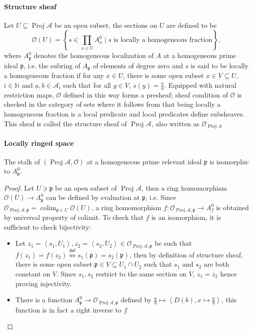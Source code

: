 \documentclass[a4paper,UKenglish,cleveref, autoref, thm-restate]{lipics-v2021}
\begin{document}
\paragraph*{Structure sheaf}
Let $U\subseteq \operatorname{Proj}\mathcal{A}$ be an open subset, the sections on $U$ are defined to be
$$
    \mathcal{O}(U) = \left\{s \in \prod_{x\in U}A_x^0\mid s\text{~is locally a homogeneous fraction}\right\},   
$$
where $A^0_{\mathfrak{p}}$ denotes the homogeneous localization of $A$ at a homogeneous prime ideal $\mathfrak{p}$, i.e. the subring of $A_{\mathfrak{p}}$ of elements of degree zero and $s$ is said to be locally a homogeneous fraction if for any $x \in U$, there is some open subset $x\in V \subseteq U$, $i\in\mathbb{N}$ and $a, b\in\mathcal{A}_i$ such that for all $y\in V$, $s(y)=\frac{a}{b}$. Equipped with natural restriction maps, $\mathcal{O}$ defined in this way forms a presheaf; sheaf condition of $\mathcal{O}$ is checked in the category of sets where it follows from that being locally a homogeneous fraction is a local predicate and local predicates define subsheaves. This sheaf is called the structure sheaf of $\operatorname{Proj}\mathcal{A}$, also written as $\mathcal{O}_{\operatorname{Proj} A}$

\paragraph*{Locally ringed space}
\begin{theorem}\label{thm:proj_as_locally_ringed_space}
    The stalk of $(\operatorname{Proj}\mathcal{A}, \mathcal{O})$ at a homogeneous prime relevant ideal $\mathfrak{p}$ is isomorphic to $A^0_\mathfrak{p}$.
\end{theorem}
\begin{proof}
    Let $U\ni\mathfrak{p}$ be an open subset of $\operatorname{Proj}\mathcal{A}$, then a ring homomorphism $\mathcal{O}(U)\to A^0_\mathfrak{p}$ can be defined by evaluation at $\mathfrak p$, i.e. Since $\mathcal{O}_{\operatorname{Proj}\mathcal{A},\mathfrak{p}}=\operatorname{colim}_{\mathfrak{p}\in U}\mathcal{O}(U)$, a ring homomorphism $f:\mathcal{O}_{\operatorname{Proj}\mathcal{A},\mathfrak{p}}\to A^0_f$ is obtained by universal property of colimit. To check that $f$ is an isomorphism, it is sufficient to check bijectivity:
    \begin{itemize}
        \item Let $z_1=\left\langle s_1, U_1\right\rangle, z_2=\left\langle s_2, U_2\right\rangle \in \mathcal{O}_{\operatorname{Proj}\mathcal{A},\mathfrak{p}}$ be such that $f(z_1)=f(z_2) \stackrel{\mathsf{def}}{\iff} s_1(\mathfrak{p})=s_2(\mathfrak{p})$, then by definition of structure sheaf, there is some open subset $\mathfrak{p}\in V\subseteq U_1\cap U_2$ such that $s_1$ and $s_2$ are both constant on $V$. Since $s_1, s_2$ restrict to the same section on $V$, $z_1 = z_2$ hence proving injectivity.
        \item There is a function $A^0_{\mathfrak{p}}\to \mathcal{O}_{\operatorname{Proj}\mathcal{A},\mathfrak{p}}$ defined by $\frac a b\mapsto \left\langle D(b), x\mapsto \frac a b\right\rangle$, this function is in fact a right inverse to $f$.
    \end{itemize}
\end{proof}
\end{document}

